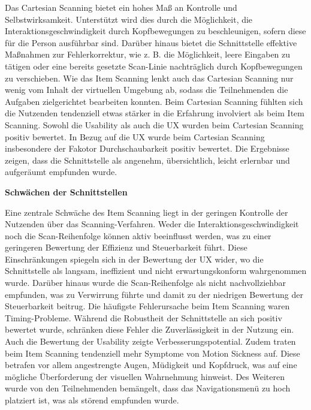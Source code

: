 Das Cartesian Scanning bietet ein hohes Maß an Kontrolle und Selbstwirksamkeit. Unterstützt wird dies durch die Möglichkeit, die Interaktionsgeschwindigkeit durch Kopfbewegungen zu beschleunigen, sofern diese für die Person ausführbar sind. Darüber hinaus bietet die Schnittstelle effektive Maßnahmen zur Fehlerkorrektur, wie z. B.  die Möglichkeit, leere Eingaben zu tätigen oder eine bereits gesetzte Scan-Linie nachträglich durch Kopfbewegungen zu verschieben.
Wie das Item Scanning lenkt auch das Cartesian Scanning nur wenig vom Inhalt der virtuellen Umgebung ab, sodass die Teilnehmenden die Aufgaben zielgerichtet bearbeiten konnten. Beim Cartesian Scanning fühlten sich die Nutzenden tendenziell etwas stärker in die Erfahrung involviert als beim Item Scanning.
Sowohl die Usability als auch die UX wurden beim Cartesian Scanning positiv bewertet. In Bezug auf die UX wurde beim Cartesian Scanning insbesondere der Fakotor Durchschaubarkeit positiv bewertet. Die Ergebnisse zeigen, dass die Schnittstelle als angenehm, übersichtlich, leicht erlernbar und aufgeräumt empfunden wurde.

\textbf{Schwächen der Schnittstellen}

Eine zentrale Schwäche des Item Scanning liegt in der geringen Kontrolle der Nutzenden über das Scanning-Verfahren. Weder die Interaktionsgeschwindigkeit noch die Scan-Reihenfolge können aktiv beeinflusst werden, was zu einer geringeren Bewertung der Effizienz und Steuerbarkeit führt. Diese Einschränkungen spiegeln sich in der Bewertung der UX wider, wo die Schnittstelle als langsam, ineffizient und nicht erwartungskonform wahrgenommen wurde. Darüber hinaus wurde die Scan-Reihenfolge als nicht nachvollziehbar empfunden, was zu Verwirrung führte und damit zu der niedrigen Bewertung der Steuerbarkeit beitrug.
Die häufigste Fehlerursache beim Item Scanning waren Timing-Probleme. Während die Robustheit der Schnittstelle an sich positiv bewertet wurde, schränken diese Fehler die Zuverlässigkeit in der Nutzung ein. Auch die Bewertung der Usability zeigte Verbesserungspotential.
Zudem traten beim Item Scanning tendenziell mehr Symptome von Motion Sickness auf. Diese betrafen vor allem angestrengte Augen, Müdigkeit und Kopfdruck, was auf eine mögliche Überforderung der visuellen Wahrnehmung hinweist. Des Weiteren wurde von den Teilnehmenden bemängelt, dass das Navigationsmenü zu hoch platziert ist, was als störend empfunden wurde. 

